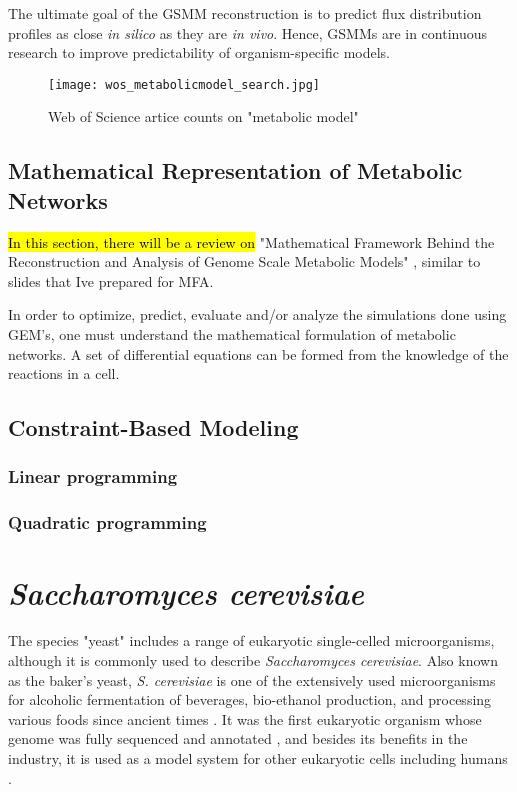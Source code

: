 The ultimate goal of the GSMM reconstruction is to predict flux distribution profiles as close \emph{in silico} as they are \emph{in vivo}. Hence, GSMMs are in continuous research to improve predictability of organism-specific models.

\begin{figure}[ht]
\begin{center}
\texttt{[image: wos\_metabolicmodel\_search.jpg]}
\end{center}
\caption[Web of Science artice counts on "metabolic model"]{Web of Science artice counts on "metabolic model"}
\label{fig:wos_metabolicmodel}
\end{figure}


\subsection{Mathematical Representation of Metabolic Networks}
\hl{In this section, there will be a review on} "Mathematical Framework Behind the Reconstruction and Analysis of Genome Scale Metabolic Models" \cite{pinzon2018mathematical}, similar to slides that Ive prepared for MFA.


In order to optimize, predict, evaluate and/or analyze the simulations done using GEM's, one must understand the mathematical formulation of metabolic networks. A set of differential equations can be formed from the knowledge of the reactions in a cell.


\subsection{Constraint-Based Modeling}
\subsubsection{Linear programming}
\subsubsection{Quadratic programming}


\section{\emph{Saccharomyces cerevisiae}}

The species "yeast" includes a range of eukaryotic single-celled microorganisms, although it is commonly used to describe \emph{Saccharomyces cerevisiae}. Also known as the baker's yeast, \emph{S. cerevisiae} is one of the extensively used microorganisms for alcoholic fermentation of beverages, bio-ethanol production, and processing various foods since ancient times \cite{gelinas2009inventions}. It was the first eukaryotic organism whose genome was fully sequenced and annotated \cite{goffeau1997multidrug}, and besides its benefits in the industry, it is used as a model system for other eukaryotic cells including humans \cite{dujon1996yeast, botstein1997yeast}.

